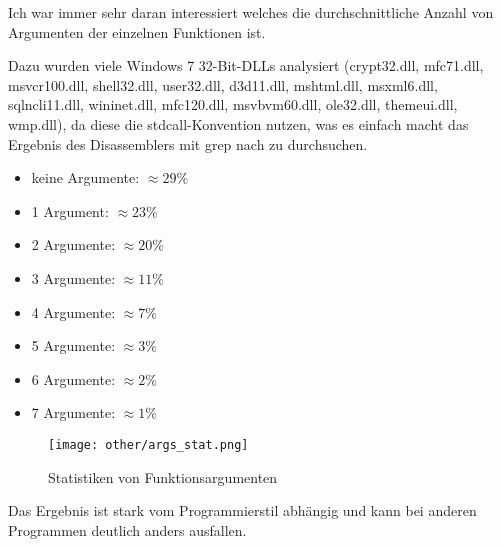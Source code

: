 \label{args_stat}

Ich war immer sehr daran interessiert welches die durchschnittliche Anzahl von
Argumenten der einzelnen Funktionen ist.

Dazu wurden viele Windows 7 32-Bit-DLLs analysiert
(crypt32.dll, mfc71.dll, msvcr100.dll, shell32.dll, user32.dll, d3d11.dll, mshtml.dll,
msxml6.dll, sqlncli11.dll, wininet.dll, mfc120.dll, msvbvm60.dll, ole32.dll, themeui.dll,
wmp.dll), da diese die stdcall-Konvention nutzen, was es einfach macht das Ergebnis des
Disassemblers mit grep nach  zu durchsuchen.

\begin{itemize}
\item keine Argumente: $\approx 29\%$
\item 1 Argument: $\approx 23\%$
\item 2 Argumente: $\approx 20\%$
\item 3 Argumente: $\approx 11\%$
\item 4 Argumente: $\approx 7\%$
\item 5 Argumente: $\approx 3\%$
\item 6 Argumente: $\approx 2\%$
\item 7 Argumente: $\approx 1\%$
\end{itemize}

\begin{figure}[H]
\centering
\texttt{[image: other/args\_stat.png]}
\caption{Statistiken von Funktionsargumenten}
\end{figure}

Das Ergebnis ist stark vom Programmierstil abhängig und kann bei anderen Programmen
deutlich anders ausfallen.
